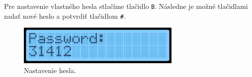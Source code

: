 Pre nastavenie vlastného hesla stlačíme tlačidlo \texttt{B}. Následne je možné tlačidlami zadať nové heslo a potvrdiť tlačidlom \texttt{\#}.

\begin{figure}[h]
    \centering
    \includegraphics[width=0.7\textwidth]{img/display_set_pass.png}
    \caption{Nastavenie hesla.}
\end{figure}
